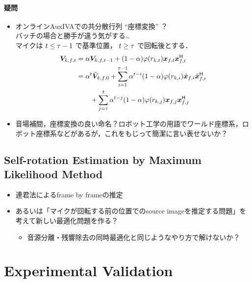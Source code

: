 \documentclass[sip,biber]{now-journal}
\begin{document}
\paragraph*{疑問}
\begin{itemize}
  \item オンラインAuxIVAでの共分散行列 ``座標変換'' ？\\ バッチの場合と勝手が違う気がする…\\
    マイクは $t \leq \tau - 1$ で基準位置，
    $t \geq \tau$ で回転後とする．
    \begin{align*}
      \cov _{\src,\ft} &= \forget \cov _{\src,\ft[-1]} + (1 - \forget) \weight(\var _{\src,\tframe}) \Obs _{\ft} \Obs _{\ft} ^{\hermite} \\
                             &= \forget ^{\tframe} \refpos{\cov} _{\src,\freq,0}
                                + \sum _{i = 1} ^{\rotFra - 1} \forget ^{\tframe - i} (1 - \forget) \weight(\var _{\src,i}) \refpos{\Obs} _{\freq,i} \refpos{\Obs} _{\freq,i} ^{\hermite} \\
                             &\qquad + \sum _{j = \rotFra} ^{\tframe} \forget ^{\tframe - j} (1 - \forget) \weight(\var _{\src,j}) \Obs _{\freq,j} \Obs _{\freq,j} ^{\hermite}
    \end{align*}
  \item 音場補間，座標変換の良い命名？ロボット工学の用語でワールド座標系，ロボット座標系などがあるが，これをもじって簡潔に言い表せないか？
\end{itemize}

\subsection{Self-rotation Estimation by Maximum Likelihood Method}

\begin{itemize}
  \item 連君法によるframe by frameの推定
  \item あるいは「マイクが回転する前の位置でのsource imageを推定する問題」を考えて新しい最適化問題を作る？
    \begin{itemize}
      \item 音源分離・残響除去の同時最適化と同じようなやり方で解けないか？
    \end{itemize}
\end{itemize}

\section{Experimental Validation}\label{sec:experiment}
\end{document}

